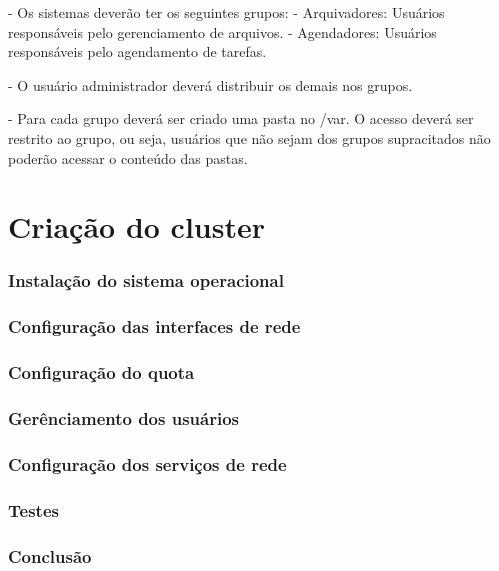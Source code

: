 \documentclass[
	12pt,				%
	openany,			%
	a4paper,			%
	chapter=TITLE,		%
	section=TITLE,		%
	english,
	brazil				%
]{abntex2}
\begin{document}
- Os sistemas deverão ter os seguintes grupos:
    - Arquivadores: Usuários responsáveis pelo gerenciamento de arquivos.
    - Agendadores: Usuários responsáveis pelo agendamento de tarefas.

- O usuário administrador deverá distribuir os demais nos grupos.

- Para cada grupo deverá ser criado uma pasta no /var. O acesso deverá ser restrito ao grupo, ou seja, usuários que não sejam dos grupos supracitados não poderão acessar o conteúdo das pastas.

\chapter{Criação do cluster}

\subsection{Instalação do sistema operacional}

\subsection{Configuração das interfaces de rede}

\subsection{Configuração do quota}

\subsection{Gerênciamento dos usuários}

\subsection{Configuração dos serviços de rede}

\subsection{Testes}

\subsection{Conclusão}
\end{document}
